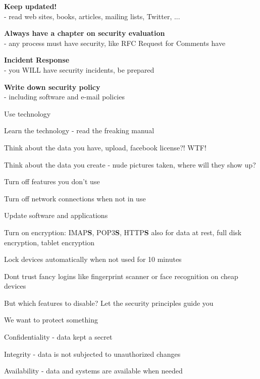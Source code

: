 \documentclass[Screen16to9,17pt]{foils}
\begin{document}

\begin{list1}
\item {\bf Keep updated!}\\ - read web sites, books, articles, mailing lists, Twitter, ...
\item {\bf Always have a chapter on security evaluation }\\ - any process must have security, like RFC Request for Comments have
\item {\bf Incident Response}\\ - you WILL have security incidents, be prepared
\item {\bf Write down security policy}\\ - including software and e-mail policies
\end{list1}


\begin{list1}
\item Use technology
\item Learn the technology - read the freaking manual
\item Think about the data you have, upload, facebook license?! WTF!
\item Think about the data you create - nude pictures taken, where will they show up?
\begin{list2}
\item Turn off features you don't use
\item Turn off network connections when not in use
\item Update software and applications
\item Turn on encryption: IMAP{\bf S}, POP3{\bf S},
  HTTP{\bf S} also for data at rest, full disk encryption, tablet encryption
\item Lock devices automatically when not used for 10 minutes
\item Dont trust fancy logins like fingerprint scanner or face recognition on cheap devices
\end{list2}
\end{list1}

But which features to disable? Let the security principles guide you



\begin{list1}
\item We want to protect something
\item Confidentiality - data kept a secret
\item Integrity - data is not subjected to unauthorized changes
\item Availability - data and systems are available when needed
\end{list1}
\end{document}
